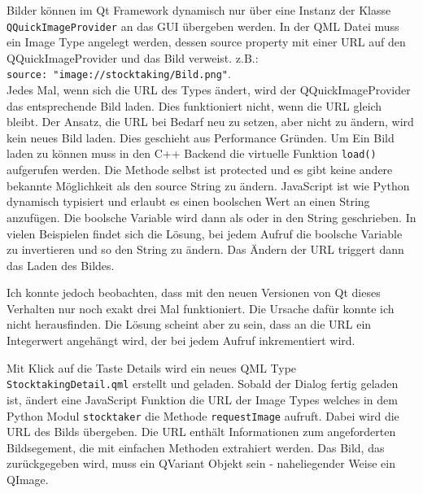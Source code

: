 Bilder können im Qt Framework dynamisch nur über eine Instanz der Klasse \verb|QQuickImageProvider| an das GUI übergeben werden.
In der QML Datei muss ein Image Type angelegt werden, dessen source property mit einer URL auf den QQuickImageProvider und das Bild verweist.
z.B.: \\ \verb|source: "image://stocktaking/Bild.png"|.\\
Jedes Mal, wenn sich die URL des Types ändert, wird der QQuickImageProvider das entsprechende Bild laden. 
Dies funktioniert nicht, wenn die URL gleich bleibt.
Der Ansatz, die URL bei Bedarf neu zu setzen, aber nicht zu ändern, wird kein neues Bild laden.
Dies geschieht aus Performance Gründen. 
Um Ein Bild laden zu können muss in den C++ Backend die virtuelle Funktion \verb|load()| aufgerufen werden. 
Die Methode selbst ist protected und es gibt keine andere bekannte Möglichkeit als den source String zu ändern.
JavaScript ist wie Python dynamisch typisiert und erlaubt es einen  boolschen Wert an einen String anzufügen. 
Die boolsche Variable wird dann als \grq{} oder \grq{} in den String geschrieben.
In vielen Beispielen findet sich die Lösung, bei jedem Aufruf die boolsche Variable zu invertieren und so den String zu ändern.
Das Ändern der URL triggert dann das Laden des Bildes.

Ich konnte jedoch beobachten, dass mit den neuen Versionen von Qt dieses Verhalten nur noch exakt drei Mal funktioniert. 
Die Ursache dafür konnte ich nicht herausfinden.
Die Lösung scheint aber zu sein, dass an die URL ein Integerwert angehängt wird, der bei jedem Aufruf inkrementiert wird.

Mit Klick auf die Taste \glq Details\grq{} wird ein neues QML Type \verb|StocktakingDetail.qml| erstellt und geladen. 
Sobald der Dialog fertig geladen ist, ändert eine JavaScript Funktion die URL der Image Types welches in dem Python Modul \verb|stocktaker| 
die Methode \verb|requestImage| aufruft. Dabei wird die URL des Bilds übergeben. 
Die URL enthält Informationen zum angeforderten Bildsegement, die mit einfachen Methoden extrahiert werden.
Das Bild, das zurückgegeben wird, muss ein QVariant Objekt sein - naheliegender Weise ein QImage.